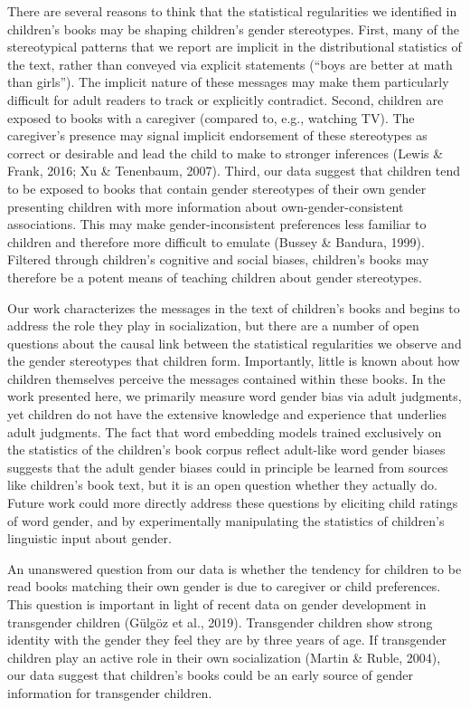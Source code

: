 \documentclass[
  english,
  ,man,floatsintext]{apa6}
\begin{document}
There are several reasons to think that the statistical regularities we identified in children's books may be shaping children's gender stereotypes. First, many of the stereotypical patterns that we report are implicit in the distributional statistics of the text, rather than conveyed via explicit statements (\enquote{boys are better at math than girls}). The implicit nature of these messages may make them particularly difficult for adult readers to track or explicitly contradict. Second, children are exposed to books with a caregiver (compared to, e.g., watching TV). The caregiver's presence may signal implicit endorsement of these stereotypes as correct or desirable and lead the child to make to stronger inferences (Lewis \& Frank, 2016; Xu \& Tenenbaum, 2007). Third, our data suggest that children tend to be exposed to books that contain gender stereotypes of their own gender presenting children with more information about own-gender-consistent associations. This may make gender-inconsistent preferences less familiar to children and therefore more difficult to emulate (Bussey \& Bandura, 1999). Filtered through children's cognitive and social biases, children's books may therefore be a potent means of teaching children about gender stereotypes.

Our work characterizes the messages in the text of children's books and begins to address the role they play in socialization, but there are a number of open questions about the causal link between the statistical regularities we observe and the gender stereotypes that children form. Importantly, little is known about how children themselves perceive the messages contained within these books. In the work presented here, we primarily measure word gender bias via adult judgments, yet children do not have the extensive knowledge and experience that underlies adult judgments. The fact that word embedding models trained exclusively on the statistics of the children's book corpus reflect adult-like word gender biases suggests that the adult gender biases could in principle be learned from sources like children's book text, but it is an open question whether they actually do. Future work could more directly address these questions by eliciting child ratings of word gender, and by experimentally manipulating the statistics of children's linguistic input about gender.

An unanswered question from our data is whether the tendency for children to be read books matching their own gender is due to caregiver or child preferences. This question is important in light of recent data on gender development in transgender children (Gülgöz et al., 2019). Transgender children show strong identity with the gender they feel they are by three years of age. If transgender children play an active role in their own socialization (Martin \& Ruble, 2004), our data suggest that children's books could be an early source of gender information for transgender children.
\end{document}
